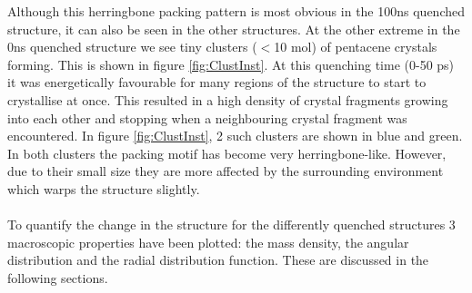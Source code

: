 Although this herringbone packing pattern is most obvious in the 100ns quenched structure, it can also be seen in the other structures. At the other extreme in the 0ns quenched structure we see tiny clusters ($<$10 mol) of pentacene crystals forming. This is shown in figure \ref{fig:ClustInst}. At this quenching time (0-50 ps) it was energetically favourable for many regions of the structure to start to crystallise at once. This resulted in a high density of crystal fragments growing into each other and stopping when a neighbouring crystal fragment was encountered. In figure \ref{fig:ClustInst}, 2 such clusters are shown in blue and green. In both clusters the packing motif has become very herringbone-like. However, due to their small size they are more affected by the surrounding environment which warps the structure slightly. 
\\\\
\noindent To quantify the change in the structure for the differently quenched structures 3 macroscopic properties have been plotted: the mass density, the angular distribution and the radial distribution function. These are discussed in the following sections.
